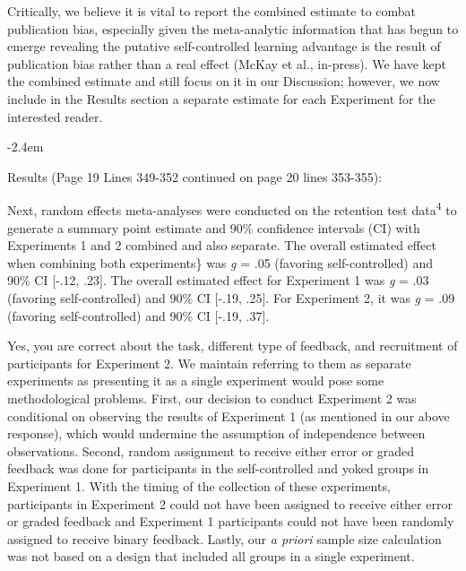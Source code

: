 \documentclass[final]{article}
\renewenvironment{quote}{\begin{fquote}\advance\leftmargini -2.4em\begin{oldquote}}{\end{oldquote}\end{fquote}}
\newenvironment{fquote}
  {\def\FrameCommand{
	\fboxsep=0.6em %
	\fcolorbox{black}{white}}%
    \MakeFramed {\advance\hsize-2\width \FrameRestore}
    \begin{minipage}{\linewidth}
  }
  {\end{minipage}\endMakeFramed}
\newcommand{\TaskEstimationBox}[2]{%
\ifoptiondraft{\parbox{1.0\linewidth}{\hfill \hfill {\colorbox{#2}{\color{White} \textbf{#1}}}}}%
{}%
}
\def\Done {\TaskEstimationBox{Done}{Blue}}
\begin{document}
Critically, we believe it is vital to report the combined estimate to combat publication bias, especially given the meta-analytic information that has begun to emerge revealing the putative self-controlled learning advantage is the result of publication bias rather than a real effect (McKay et al., in-press). We have kept the combined estimate and still focus on it in our Discussion; however, we now include in the Results section a separate estimate for each Experiment for the interested reader.

\begin{quote}
Results (Page 19 Lines 349-352 continued on page 20 lines 353-355):

Next, random effects meta-analyses were conducted on the retention test data\textsuperscript{4} to generate a summary point estimate and 90\% confidence intervals (CI) with Experiments 1 and 2 combined and also separate. The overall estimated effect when combining both experiments\} was \emph{g} = .05 (favoring self-controlled) and 90\% CI {[}-.12, .23{]}. The overall estimated effect for Experiment 1 was \emph{g} = .03 (favoring self-controlled) and 90\% CI {[}-.19, .25{]}. For Experiment 2, it was \emph{g} = .09 (favoring self-controlled) and 90\% CI {[}-.19, .37{]}.
\end{quote}

\Done


Yes, you are correct about the task, different type of feedback, and recruitment of participants for Experiment 2. We maintain referring to them as separate experiments as presenting it as a single experiment would pose some methodological problems. First, our decision to conduct Experiment 2 was conditional on observing the results of Experiment 1 (as mentioned in our above response), which would undermine the assumption of independence between observations. Second, random assignment to receive either error or graded feedback was done for participants in the self-controlled and yoked groups in Experiment 1. With the timing of the collection of these experiments, participants in Experiment 2 could not have been assigned to receive either error or graded feedback and Experiment 1 participants could not have been randomly assigned to receive binary feedback. Lastly, our \emph{a priori} sample size calculation was not based on a design that included all groups in a single experiment.
\end{document}
